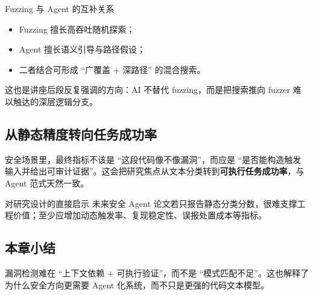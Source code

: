 \begin{knowledgebox}{Fuzzing 与 Agent 的互补关系}
\begin{itemize}
    \item Fuzzing 擅长高吞吐随机探索；
    \item Agent 擅长语义引导与路径假设；
    \item 二者结合可形成 ``广覆盖 + 深路径'' 的混合搜索。
\end{itemize}
这也是讲座后段反复强调的方向：AI 不替代 fuzzing，而是把搜索推向 fuzzer 难以触达的深层逻辑分支。
\end{knowledgebox}

\subsection{从静态精度转向任务成功率}
安全场景里，最终指标不该是 ``这段代码像不像漏洞''，而应是 ``是否能构造触发输入并给出可审计证据''。这会把研究焦点从文本分类转到\textbf{可执行任务成功率}，与 Agent 范式天然一致。

\begin{importantbox}{对研究设计的直接启示}
未来安全 Agent 论文若只报告静态分类分数，很难支撑工程价值；至少应增加动态触发率、复现稳定性、误报处置成本等指标。
\end{importantbox}

\subsection{本章小结}
漏洞检测难在 ``上下文依赖 + 可执行验证''，而不是 ``模式匹配不足''。这也解释了为什么安全方向更需要 Agent 化系统，而不只是更强的代码文本模型。

